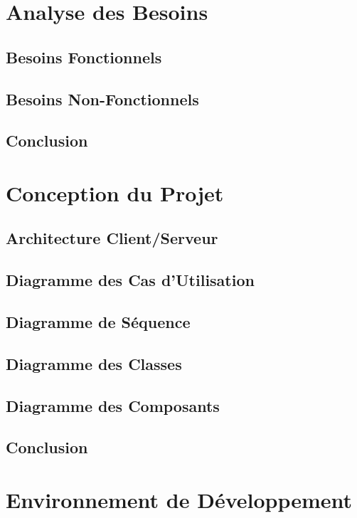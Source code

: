 \section{Analyse des Besoins}

\subsection{Besoins Fonctionnels}

\subsection{Besoins Non-Fonctionnels}

\subsection*{Conclusion}

\section{Conception du Projet}

\subsection{Architecture Client/Serveur}

\subsection{Diagramme des Cas d'Utilisation}

\subsection{Diagramme de Séquence}

\subsection{Diagramme des Classes}

\subsection{Diagramme des Composants}

\subsection*{Conclusion}

\section{Environnement de Développement}

